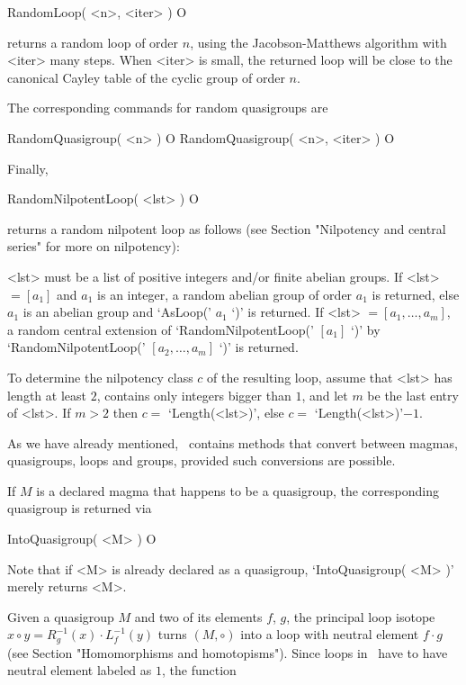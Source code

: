 \>RandomLoop( <n>, <iter> ) O

returns a random loop of order $n$, using the Jacobson-Matthews algorithm with
<iter> many steps. When <iter> is small, the returned loop will be close to the
canonical Cayley table of the cyclic group of order $n$.

The corresponding commands for random quasigroups
are

\>RandomQuasigroup( <n> ) O
\>RandomQuasigroup( <n>, <iter> ) O

Finally,

\>RandomNilpotentLoop( <lst> ) O

returns a random nilpotent loop as follows (see Section "Nilpotency
and central series" for more on nilpotency):

<lst> must be a list of positive integers and/or finite abelian groups. If
<lst> $= [a_1]$ and $a_1$ is an integer, a random abelian group of order $a_1$
is returned, else $a_1$ is an abelian group and `AsLoop(' $a_1$ `)' is
returned. If <lst> $=[a_1,\dots,a_m]$, a random central extension of
`RandomNilpotentLoop(' $[a_1]$ `)' by `RandomNilpotentLoop(' $[a_2,\dots,a_m]$
`)' is returned.

To determine the nilpotency class $c$ of the resulting loop, assume that <lst>
has length at least $2$, contains only integers bigger than $1$, and let $m$ be
the last entry of <lst>. If $m>2$ then $c=$ `Length(<lst>)', else $c=$
`Length(<lst>)'$-1$.


As we have already mentioned, \LOOPS\ contains methods that convert between
magmas, quasigroups, loops and groups, provided such conversions are possible.

If $M$ is a declared magma that happens to be a quasigroup, the corresponding
quasigroup is returned via

\>IntoQuasigroup( <M> ) O

Note that if <M> is already declared as a quasigroup, `IntoQuasigroup( <M> )'
merely returns <M>.

Given a quasigroup $M$ and two of its elements $f$, $g$, the principal loop
isotope $x\circ y = R_g^{-1}(x)\cdot L_f^{-1}(y)$ turns $(M,\circ)$ into a loop
with neutral element $f\cdot g$ (see Section "Homomorphisms and homotopisms").
Since loops in \LOOPS\ have to have neutral element labeled as $1$, the
function

